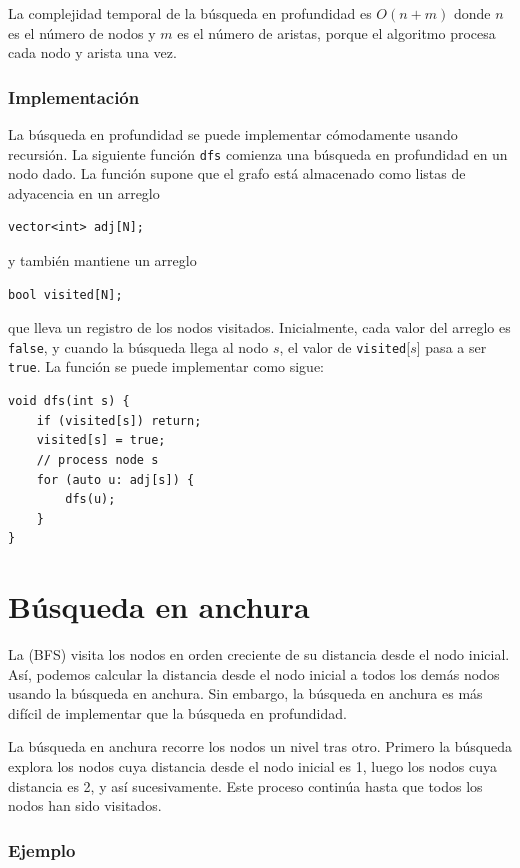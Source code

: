 La complejidad temporal de la búsqueda en profundidad es $O(n+m)$
donde $n$ es el número de nodos y $m$ es el
número de aristas,
porque el algoritmo procesa cada nodo y arista una vez.

\subsubsection*{Implementación}

La búsqueda en profundidad se puede
implementar cómodamente usando recursión.
La siguiente función \texttt{dfs} comienza
una búsqueda en profundidad en un nodo dado.
La función supone que el grafo está
almacenado como listas de adyacencia en un arreglo
\begin{lstlisting}
vector<int> adj[N];
\end{lstlisting}
y también mantiene un arreglo
\begin{lstlisting}
bool visited[N];
\end{lstlisting}
que lleva un registro de los nodos visitados.
Inicialmente, cada valor del arreglo es \texttt{false},
y cuando la búsqueda llega al nodo $s$,
el valor de \texttt{visited}[$s$] pasa a ser \texttt{true}.
La función se puede implementar como sigue:
\begin{lstlisting}
void dfs(int s) {
    if (visited[s]) return;
    visited[s] = true;
    // process node s
    for (auto u: adj[s]) {
        dfs(u);
    }
}
\end{lstlisting}

\section{Búsqueda en anchura}


La  (BFS) visita los nodos
en orden creciente de su distancia
desde el nodo inicial.
Así, podemos calcular la distancia
desde el nodo inicial a todos los demás
nodos usando la búsqueda en anchura.
Sin embargo, la búsqueda en anchura es más difícil
de implementar que la búsqueda en profundidad.

La búsqueda en anchura recorre los nodos
un nivel tras otro.
Primero la búsqueda explora los nodos cuya
distancia desde el nodo inicial es 1,
luego los nodos cuya distancia es 2, y así sucesivamente.
Este proceso continúa hasta que todos los nodos
han sido visitados.

\subsubsection*{Ejemplo}

